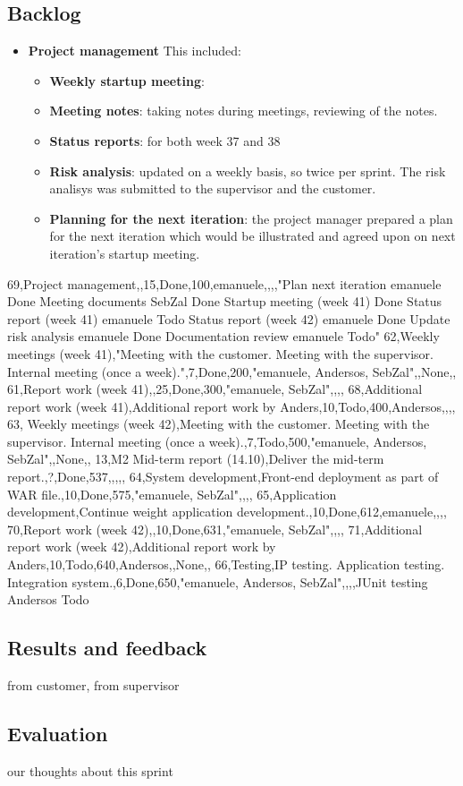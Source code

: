 \subsection{Backlog}


\begin{itemize}
\item \textbf{Project management}\newline
	This included:
	\begin{itemize}
		\item \textbf{Weekly startup meeting}: 
		\item \textbf{Meeting notes}:
			taking notes during meetings, reviewing of the notes.
		\item \textbf{Status reports}:
			for both week 37 and 38
		\item \textbf{Risk analysis}:
			updated on a weekly basis, so twice per sprint.
			The risk analisys was submitted to the supervisor and the customer.
		\item \textbf{Planning for the next iteration}:
			the project manager prepared a plan for the next iteration
			which would be illustrated and agreed upon on next iteration's startup meeting.
	\end{itemize}
	
\end{itemize}



69,Project management,,15,Done,100,emanuele,,,,"Plan next iteration	emanuele	Done
Meeting documents	SebZal	Done
Startup meeting (week 41)	Done
Status report (week 41)	emanuele	Todo
Status report (week 42)	emanuele	Done
Update risk analysis	emanuele	Done
Documentation review	emanuele	Todo"
62,Weekly meetings (week 41),"Meeting with the customer.
Meeting with the supervisor.
Internal meeting (once a week).",7,Done,200,"emanuele, Andersos, SebZal",,None,,
61,Report work (week 41),,25,Done,300,"emanuele, SebZal",,,,
68,Additional report work (week 41),Additional report work by Anders,10,Todo,400,Andersos,,,,
63, Weekly meetings (week 42),Meeting with the customer. Meeting with the supervisor. Internal meeting (once a week).,7,Todo,500,"emanuele, Andersos, SebZal",,None,,
13,M2 Mid-term report (14.10),Deliver the mid-term report.,?,Done,537,,,,,
64,System development,Front-end deployment as part of WAR file.,10,Done,575,"emanuele, SebZal",,,,
65,Application development,Continue weight application development.,10,Done,612,emanuele,,,,
70,Report work (week 42),,10,Done,631,"emanuele, SebZal",,,,
71,Additional report work (week 42),Additional report work by Anders,10,Todo,640,Andersos,,None,,
66,Testing,IP testing. Application testing. Integration system.,6,Done,650,"emanuele, Andersos, SebZal",,,,JUnit testing	Andersos	Todo



\subsection{Results and feedback}
from customer, from supervisor
\subsection{Evaluation}
our thoughts about this sprint